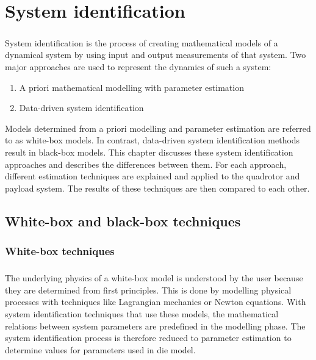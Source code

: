 \graphicspath{{system_id/fig/}}

\chapter{System identification}
\label{chap:system_id}

    \paragraph{}
    System identification is the process of creating mathematical models of a dynamical system by using input and output measurements of that system.
    Two major approaches are used to represent the dynamics of such a system:
    \begin{enumerate}
        \item A priori mathematical modelling with parameter estimation
        \item Data-driven system identification
    \end{enumerate}

    Models determined from a priori modelling and parameter estimation are referred to as white-box models.
    In contrast, data-driven system identification methods result in black-box models.
    This chapter discusses these system identification approaches and describes the differences between them.
    For each approach, different estimation techniques are explained and applied to the quadrotor and payload system.
    The results of these techniques are then compared to each other.    

\section{White-box and black-box techniques}

    \subsection{White-box techniques}

        \paragraph{} 
        The underlying physics of a white-box model is understood by the user because    
        they are determined from first principles.
        This is done by modelling physical processes with techniques like Lagrangian mechanics or Newton equations.
        With system identification techniques that use these models, 
        the mathematical relations between system parameters are predefined in the modelling phase.
        The system identification process is therefore reduced to parameter estimation to determine values for parameters used in die model.

